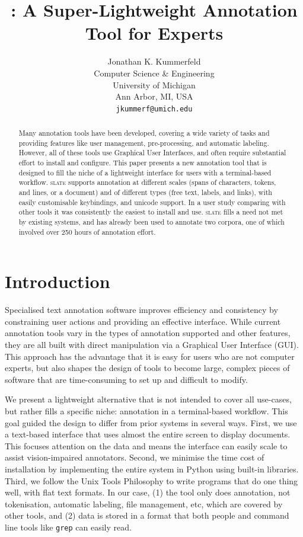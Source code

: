 \documentclass[11pt,a4paper]{article}
\title{\slate: A Super-Lightweight Annotation Tool for Experts}
\author{
  Jonathan K. Kummerfeld \\
  Computer Science \& Engineering \\
  University of Michigan \\
  Ann Arbor, MI, USA \\
  {\tt jkummerf@umich.edu}
}
\date{}
\newcommand\Slate{\textsc{slate}\xspace}
\begin{document}
\maketitle

\begin{abstract}

  Many annotation tools have been developed, covering a wide variety of tasks and providing features like user management, pre-processing, and automatic labeling.
  However, all of these tools use Graphical User Interfaces, and often require substantial effort to install and configure.
  This paper presents a new annotation tool that is designed to fill the niche of a lightweight interface for users with a terminal-based workflow.
  \Slate supports annotation at different scales (spans of characters, tokens, and lines, or a document) and of different types (free text, labels, and links), with easily customisable keybindings, and unicode support.
  In a user study comparing with other tools it was consistently the easiest to install and use.
  \Slate fills a need not met by existing systems, and has already been used to annotate two corpora, one of which involved over 250 hours of annotation effort.

\end{abstract}

\section{Introduction}

Specialised text annotation software improves efficiency and consistency by constraining user actions and providing an effective interface.
While current annotation tools vary in the types of annotation supported and other features, they are all built with direct manipulation via a Graphical User Interface (GUI).
This approach has the advantage that it is easy for users who are not computer experts, but also shapes the design of tools to become large, complex pieces of software that are time-consuming to set up and difficult to modify.

We present a lightweight alternative that is not intended to cover all use-cases, but rather fills a specific niche: annotation in a terminal-based workflow.
This goal guided the design to differ from prior systems in several ways.
First, we use a text-based interface that uses almost the entire screen to display documents.
This focuses attention on the data and means the interface can easily scale to assist vision-impaired annotators.
Second, we minimise the time cost of installation by implementing the entire system in Python using built-in libraries.
Third, we follow the Unix Tools Philosophy \citep{unix} to write programs that do one thing well, with flat text formats.
In our case,
(1) the tool only does annotation, not tokenisation, automatic labeling, file management, etc, which are covered by other tools, and
(2) data is stored in a format that both people and command line tools like \texttt{grep} can easily read.
\end{document}
